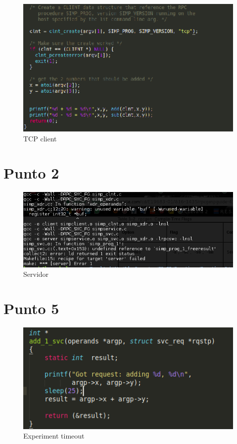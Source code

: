 \documentclass[12pt,journal,compsoc]{IEEEtran}
\begin{document}
\begin{figure}[H]
\centering
\includegraphics[width=125mm]{capturas/tcp-client.png}
\caption{TCP client}
\label{fig:tcp-client}
\end{figure}


\section{Punto 2}

\begin{figure}[H]
\centering
\includegraphics[width=125mm]{capturas/error-muli.png}
\caption{Servidor}
\label{fig:error-multi}
\end{figure}

\section{Punto 5}

\begin{figure}[H]
\centering
\includegraphics[width=125mm]{capturas/experiment-timeout25.png}
\caption{Experiment timeout}
\label{fig:experiment-timeout-25}
\end{figure}
\end{document}

